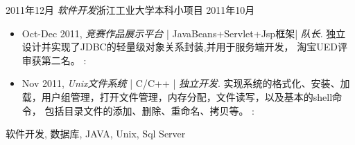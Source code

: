 \begin{experiences}
  \emptySeparator
  \experience
  {2011年12月} {\emph{软件开发}}{浙江工业大学}{本科小项目}
  {2011年10月}    {
				  	\begin{itemize}
				  		\item Oct-Dec 2011, \emph{竞赛作品展示平台} | JavaBeans+Servlet+Jsp框架| \emph{队长}. 
				  		独立设计并实现了JDBC的轻量级对象关系封装,并用于服务端开发， 淘宝UED评审获第二名。    
						  		\faGithub:                                                                            
				  		\item Nov 2011, \emph{Unix文件系统} | C/C++ | \emph{独立开发}. 
						  		实现系统的格式化、安装、加载，用户组管理，打开文件管理，内存分配，文件读写，以及基本的shell命令，
						  		包括目录文件的添加、删除、重命名、拷贝等。
						  		\faGithub: 
				  	\end{itemize}
				  }
				  {软件开发, 数据库, JAVA, Unix, Sql Server}
	
		
\end{experiences}
